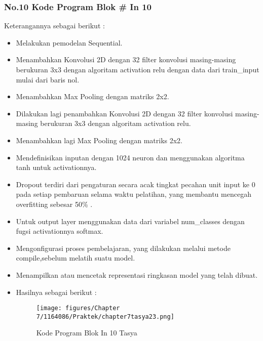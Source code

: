 \subsubsection{No.10 Kode Program Blok \# In 10}

Keterangannya sebagai berikut :
\begin{itemize}
\item Melakukan pemodelan Sequential.
\item Menambahkan Konvolusi 2D dengan 32 filter konvolusi masing-masing berukuran 3x3 dengan algoritam activation relu dengan data dari train\_input mulai dari baris nol.
\item Menambahkan Max Pooling dengan matriks 2x2.
\item Dilakukan lagi penambahkan Konvolusi 2D dengan 32 filter konvolusi masing-masing berukuran 3x3 dengan algoritam activation relu.
\item Menambahkan lagi Max Pooling dengan matriks 2x2.
\item Mendefinisikan inputan dengan 1024 neuron dan menggunakan algoritma tanh untuk activationnya.
\item Dropout terdiri dari pengaturan secara acak tingkat pecahan unit input ke 0 pada setiap pembaruan selama waktu pelatihan, yang membantu mencegah overfitting sebesar 50\% .
\item Untuk output layer menggunakan data dari variabel num\_classes dengan fugsi activationnya softmax.
\item Mengonfigurasi proses pembelajaran, yang dilakukan melalui metode compile,sebelum melatih suatu model.
\item Menampilkan atau mencetak representasi ringkasan model yang telah dibuat.
\item Hasilnya sebagai berikut :
\begin{figure}[ht]
\centering
\texttt{[image: figures/Chapter 7/1164086/Praktek/chapter7tasya23.png]}
\caption{Kode Program Blok In 10 Tasya}
\label{Praktek}
\end{figure}
\end{itemize}


